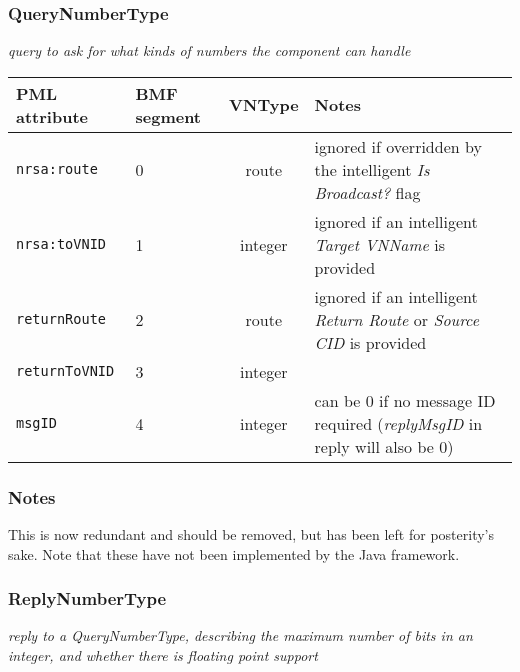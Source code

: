 \documentclass[pdftex,a4paper]{article}
\newcommand{\XMLfont}[1]{{\tt \small #1}}
\begin{document}
\clearpage

\subsubsection{QueryNumberType}

{\em query to ask for what kinds of numbers the component can handle}

\begin{table}[!h]
  \begin{center}
    \label{tab:QueryNumberType}
    \begin{tabular}{|l|p{13mm}|c|p{60mm}|}
      \hline

      \textbf{PML attribute} & \textbf{BMF segment} & \textbf{VNType}
      & \textbf{Notes} \\\hline

      \XMLfont{nrsa:route} & 0 & route & ignored if overridden by the
      intelligent {\em Is Broadcast?} flag \\\hline

      \XMLfont{nrsa:toVNID} & 1 & integer & ignored if an intelligent {\em
      Target VNName} is provided \\\hline

      \XMLfont{returnRoute} & 2 & route & ignored if an
      intelligent {\em Return Route} or {\em Source CID} is provided
      \\\hline

      \XMLfont{returnToVNID} & 3 & integer & \\\hline

      \XMLfont{msgID} & 4 & integer & can be 0 if no message ID
      required ({\em replyMsgID} in reply will also be 0) \\\hline

    \end{tabular}
  \end{center}
\end{table}

\subsubsection*{Notes}
This is now redundant and should be removed, but has been left for posterity's
sake. Note that these have not been implemented by the Java framework.

\subsubsection{ReplyNumberType}
{\em reply to a QueryNumberType, describing the maximum number of bits
  in an integer, and whether there is floating point support}
\end{document}
